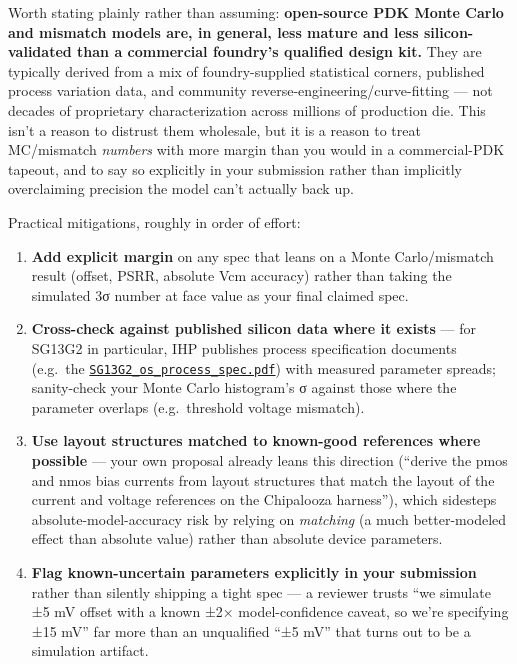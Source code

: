 \documentclass[
]{article}
\providecommand{\tightlist}{%
  \setlength{\itemsep}{0pt}\setlength{\parskip}{0pt}}
\begin{document}
Worth stating plainly rather than assuming: \textbf{open-source PDK
Monte Carlo and mismatch models are, in general, less mature and less
silicon-validated than a commercial foundry's qualified design kit.}
They are typically derived from a mix of foundry-supplied statistical
corners, published process variation data, and community
reverse-engineering/curve-fitting --- not decades of proprietary
characterization across millions of production die. This isn't a reason
to distrust them wholesale, but it is a reason to treat MC/mismatch
\emph{numbers} with more margin than you would in a commercial-PDK
tapeout, and to say so explicitly in your submission rather than
implicitly overclaiming precision the model can't actually back up.

Practical mitigations, roughly in order of effort:

\begin{enumerate}
\def\labelenumi{\arabic{enumi}.}
\tightlist
\item
  \textbf{Add explicit margin} on any spec that leans on a Monte
  Carlo/mismatch result (offset, PSRR, absolute Vcm accuracy) rather
  than taking the simulated 3σ number at face value as your final
  claimed spec.
\item
  \textbf{Cross-check against published silicon data where it exists}
  --- for SG13G2 in particular, IHP publishes process specification
  documents (e.g.~the
  \href{https://github.com/IHP-GmbH/IHP-Open-PDK/blob/main/ihp-sg13g2/libs.doc/doc/SG13G2_os_process_spec.pdf}{\texttt{SG13G2\_os\_process\_spec.pdf}})
  with measured parameter spreads; sanity-check your Monte Carlo
  histogram's σ against those where the parameter overlaps
  (e.g.~threshold voltage mismatch).
\item
  \textbf{Use layout structures matched to known-good references where
  possible} --- your own proposal already leans this direction (``derive
  the pmos and nmos bias currents from layout structures that match the
  layout of the current and voltage references on the Chipalooza
  harness''), which sidesteps absolute-model-accuracy risk by relying on
  \emph{matching} (a much better-modeled effect than absolute value)
  rather than absolute device parameters.
\item
  \textbf{Flag known-uncertain parameters explicitly in your submission}
  rather than silently shipping a tight spec --- a reviewer trusts ``we
  simulate ±5 mV offset with a known ±2× model-confidence caveat, so
  we're specifying ±15 mV'' far more than an unqualified ``±5 mV'' that
  turns out to be a simulation artifact.
\end{enumerate}
\end{document}
